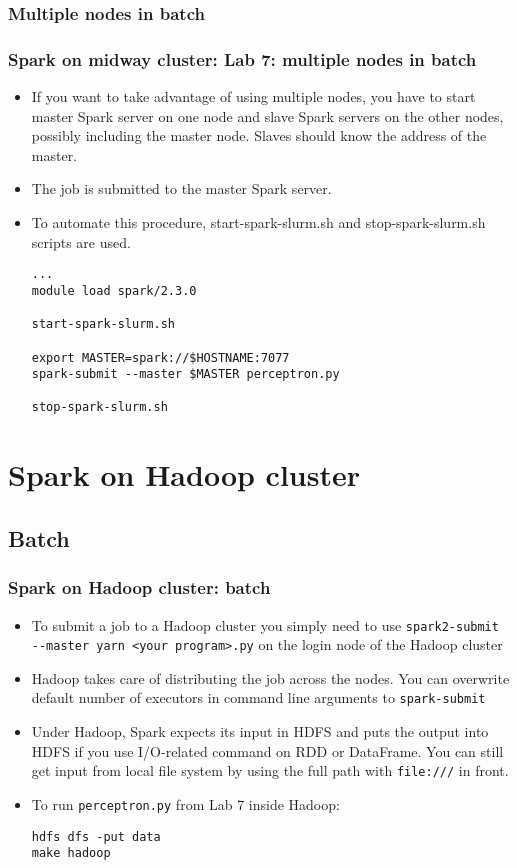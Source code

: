 \subsubsection{Multiple nodes in batch}
\begin{frame}[fragile]
  \frametitle{Spark on midway cluster: Lab 7: multiple nodes in batch}
  \begin{itemize}
  \item If you want to take advantage of using multiple nodes, 
    you have to start master Spark server on one node and slave Spark servers on the other nodes, 
    possibly including the master node. Slaves should know the address of the master.
  \item The job is submitted to the master Spark server. 
  \item To automate this procedure, {\color{mycolorcli}start-spark-slurm.sh} 
    and {\color{mycolorcli}stop-spark-slurm.sh} scripts are used.
{\color{mycolorcli}
\begin{verbatim}
...
module load spark/2.3.0

start-spark-slurm.sh

export MASTER=spark://$HOSTNAME:7077
spark-submit --master $MASTER perceptron.py

stop-spark-slurm.sh
\end{verbatim}
}

  \end{itemize}


\end{frame}


\section{Spark on Hadoop cluster}
\subsection{Batch}
\begin{frame}[fragile]
  \frametitle{Spark on Hadoop cluster: batch}
  \begin{itemize}
  \item To submit a job to a Hadoop cluster you simply need to use 
    {\color{mycolorcli}\verb|spark2-submit --master yarn <your program>.py|} on
    the login node of the Hadoop cluster
  \item Hadoop takes care of distributing the job across the nodes. You can overwrite default number of executors
    in command line arguments to {\color{mycolorcli}\verb|spark-submit|}
  \item Under Hadoop, Spark expects its input in HDFS and puts the output into HDFS
    if you use I/O-related command on RDD or DataFrame. You can still get input from local file system
    by using the full path with {\color{mycolorcli}\verb|file:///|} in front.
  \item To run {\color{mycolorcli}\verb|perceptron.py|} from Lab 7 inside Hadoop:
    {\color{mycolorcli}
\begin{verbatim}
hdfs dfs -put data
make hadoop
\end{verbatim}
    }
  \end{itemize}
\end{frame}

